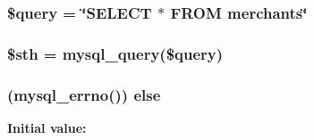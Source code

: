 \hypertarget{_p_h_p_query_8php_af59a5f7cd609e592c41dc3643efd3c98}{
\subsubsection[{\$query}]{\setlength{\rightskip}{0pt plus 5cm}\$query = \char`\"{}S\-E\-L\-E\-C\-T $\ast$ F\-R\-O\-M merchants\char`\"{}}}\label{_p_h_p_query_8php_af59a5f7cd609e592c41dc3643efd3c98}
\hypertarget{_p_h_p_query_8php_afa9126f9664959c02795be300a135f93}{
\subsubsection[{\$sth}]{\setlength{\rightskip}{0pt plus 5cm}\$sth = mysql\-\_\-query(\$query)}}\label{_p_h_p_query_8php_afa9126f9664959c02795be300a135f93}
\hypertarget{_p_h_p_query_8php_acd5fe7f2086f786c96623b819503b734}{
\subsubsection[{else}]{ (mysql\-\_\-errno()) else}}\label{_p_h_p_query_8php_acd5fe7f2086f786c96623b819503b734}
{\bfseries Initial value\-:}
